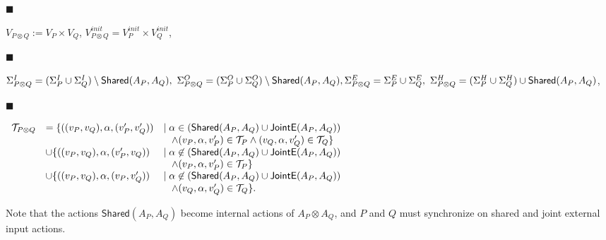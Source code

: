 \documentclass[10pt,a4paper]{article}
\begin{document}
\par\noindent  $\blacksquare$ 
 
$V_{P\otimes Q}:=V_{P}\times V_{Q}$, $V_{P\otimes Q}^{init}=V_{P}^{init}\times V_{Q}^{init}$,\par
 
 
 
\par\noindent  $\blacksquare$ 
 
$\Sigma_{P\otimes Q}^{I}=(\Sigma_{P}^{I}\cup\Sigma_{Q}^{I})\setminus\mathsf{Shared}(A_{P},A_{Q}),\ \Sigma_{P\otimes Q}^{O}=(\Sigma_{P}^{O}\cup\Sigma_{Q}^{O})\setminus\mathsf{Shared}(A_{P},A_{Q}),\\
\Sigma_{P\otimes Q}^{E}=\Sigma_{P}^{E}\cup\Sigma_{Q}^{E},\ \Sigma_{P\otimes Q}^{H}=(\Sigma_{P}^{H}\cup\Sigma_{Q}^{H})\cup\mathsf{Shared}(A_{P},A_{Q})$,\par
 
 
 
\par\noindent  $\blacksquare$ 
 
$\begin{array}[]{lll}\mathcal{T}_{P\otimes Q}&=\{((v_{P},v_{Q}),\alpha,(v_{P}^{\prime},v_{Q}^{\prime}))&\mid\alpha\in(\mathsf{Shared}(A_{P},A_{Q})\cup\mathsf{JointE}(A_{P},A_{Q}))\\
&&\;\;\;\land(v_{P},\alpha,v_{P}^{\prime})\in\mathcal{T}_{P}\land(v_{Q},\alpha,v_{Q}^{\prime})\in\mathcal{T}_{Q}\}\\
&\cup\{((v_{P},v_{Q}),\alpha,(v_{P}^{\prime},v_{Q}))&\mid\alpha\not\in(\mathsf{Shared}(A_{P},A_{Q})\cup\mathsf{JointE}(A_{P},A_{Q}))\\
&&\;\;\;\land(v_{P},\alpha,v_{P}^{\prime})\in\mathcal{T}_{P}\}\\
&\cup\{((v_{P},v_{Q}),\alpha,(v_{P},v_{Q}^{\prime}))&\mid\alpha\not\in(\mathsf{Shared}(A_{P},A_{Q})\cup\mathsf{JointE}(A_{P},A_{Q}))\\
&&\;\;\;\land(v_{Q},\alpha,v_{Q}^{\prime})\in\mathcal{T}_{Q}\}.\end{array}$\par
 
 
  
 
 
 
Note that the actions $\mathsf{Shared}(A_{P},A_{Q})$ become internal actions of $A_{P}\otimes A_{Q}$, and $P$ and $Q$ must synchronize on shared and joint external input actions.\par
 
\end{document}
